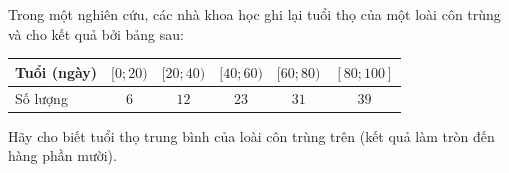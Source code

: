 \begin{ex}
Trong một nghiên cứu, các nhà khoa học ghi lại tuổi thọ của một loài côn trùng và cho kết quả bởi bảng sau:
\begin{center}\begin{tabular}{|l|c|c|c|c|c|}\hline
Tuổi (ngày) & $[0;20)$ & $[20;40)$ & $[40;60)$ & $[60;80)$ & $[80;100]$\\\hline
Số lượng & $6$ & $12$ & $23$ & $31$ & $39$\\\hline
\end{tabular}\end{center}
Hãy cho biết tuổi thọ trung bình của loài côn trùng trên (kết quả làm tròn đến hàng phần mười).
\end{ex}
